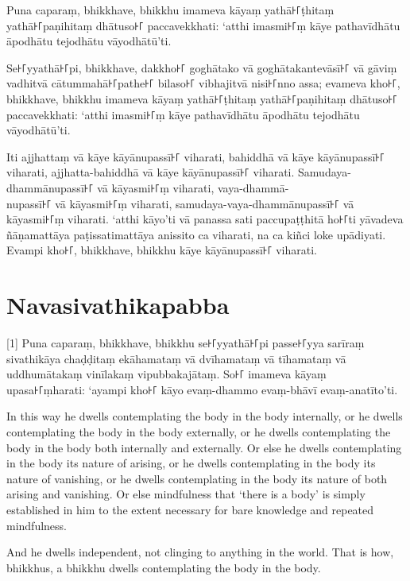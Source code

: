 Puna caparaṃ, bhikkhave, bhikkhu imameva kāyaṃ yathā꜔꜒ṭhitaṃ yathā꜔꜒paṇihitaṃ
dhātuso꜔꜒ paccavekkhati: ‘atthi imasmi꜔꜒ṃ kāye pathavīdhātu āpodhātu tejodhātu
vāyodhātū’ti.

Se꜔꜒yyathā꜔꜒pi, bhikkhave, dakkho꜔꜒ goghātako vā goghātakantevāsī꜔꜒ vā gāviṃ vadhitvā
cātummahā꜔꜒pathe꜔꜒ bilaso꜔꜒ vibhajitvā nisi꜔꜒nno assa; evameva kho꜔꜒, bhikkhave, bhikkhu
imameva kāyaṃ yathā꜔꜒ṭhitaṃ yathā꜔꜒paṇihitaṃ dhātuso꜔꜒ paccavekkhati: ‘atthi imasmi꜔꜒ṃ
kāye pathavīdhātu āpodhātu tejodhātu vāyodhātū’ti.

Iti ajjhattaṃ vā kāye kāyānupassī꜔꜒ viharati, bahiddhā vā kāye kāyānupassī꜔꜒
viharati, ajjhatta-bahiddhā vā kāye kāyānupassī꜔꜒ viharati. Samudaya-dhammānupassī꜔꜒
vā kāyasmi꜔꜒ṃ viharati, vaya-dhammā-\\
nupassī꜔꜒ vā kāyasmi꜔꜒ṃ viharati, samudaya-vaya-dhammānupassī꜔꜒ vā kāyasmi꜔꜒ṃ viharati.
‘atthi kāyo’ti vā panassa sati paccupaṭṭhitā ho꜔꜒ti yāvadeva ñāṇamattāya
paṭissatimattāya anissito ca viharati, na ca kiñci loke upādiyati. Evampi kho꜔꜒,
bhikkhave, bhikkhu kāye kāyānupassī꜔꜒ viharati.


\section*{Navasivathikapabba}

[1] Puna caparaṃ, bhikkhave, bhikkhu se꜔꜒yyathā꜔꜒pi passe꜔꜒yya sarīraṃ sivathikāya
chaḍḍitaṃ ekāhamataṃ vā dvīhamataṃ vā tīhamataṃ vā uddhumātakaṃ vinīlakaṃ
vipubbakajātaṃ. So꜔꜒ imameva kāyaṃ upasa꜔꜒ṃharati: ‘ayampi kho꜔꜒ kāyo evaṃ-dhammo
evaṃ-bhāvī evaṃ-anatīto’ti.

\englishPage

In this way he dwells contemplating the body in the body internally, or he
dwells contemplating the body in the body externally, or he dwells contemplating
the body in the body both internally and externally. Or else he dwells
contemplating in the body its nature of arising, or he dwells contemplating in
the body its nature of vanishing, or he dwells contemplating in the body its
nature of both arising and vanishing. Or else mindfulness that ‘there is a body’
is simply established in him to the extent necessary for bare knowledge and
repeated mindfulness.

And he dwells independent, not clinging to anything in the world. That is how,
bhikkhus, a bhikkhu dwells contemplating the body in the body.

